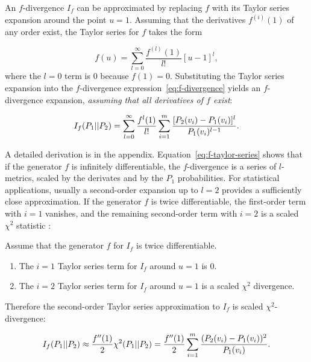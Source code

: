 {An $f$-divergence $I_{f}$ can be approximated by  replacing $f$ with its Taylor series expansion around the point $u=1$. Assuming that the derivatives $f^{(i)}(1)$ of any order exist, the Taylor series for $f$ takes the form 

 $$f(u) = \sum_{l=0}^{\infty} \frac{f^{(l)}(1)}{l!} [u-1]^{l},$$ where the $l=0$ term is 0 because $f(1) = 0$. Substituting the Taylor series expansion into the $f$-divergence expression~\eqref{eq:f-divergence}  yields an $f$-divergence expansion, {\em assuming that all derivatives of $f$ exist}:
 
\begin{equation*} \label{eq:f-taylor-series}
I_{f}(P_{1}||P_{2}) = \sum_{l=0}^{\infty} \frac{f^{l}(1)}{l!} \sum_{i=1}^{m} 
\frac{[P_{2}(v_{i}) - P_{1}(v_{i})]^{l}}
{P_{1}(v_{i})^{l-1}}.
\end{equation*}

A detailed derivation is in the appendix.  Equation~\eqref{eq:f-taylor-series} shows that if the generator $f$ is infinitely differentiable, the $f$-divergence is a series of $l$-metrics, scaled by the derivates and by the $P_1$ probabilities. For statistical applications, usually a second-order expansion up to $l=2$ provides a sufficiently close approximation. If the generator $f$ is twice differentiable, the first-order term with $i=1$ vanishes, and the remaining second-order term with $i=2$ is a scaled $\chi^{2}$ statistic \citep{Nielsen2014}:

\begin{proposition} \label{prop:xi-square}
Assume that the generator $f$ for $I_{f}$ is twice differentiable.   

\begin{enumerate}
\item The $i=1$ Taylor series term for  $I_{f}$ around $u=1$ is 0.
\item The $i=2$ Taylor series term for  $I_{f}$ around $u=1$ is a scaled $\chi^{2}$ divergence.
\end{enumerate}

Therefore the second-order Taylor series approximation to $I_{f}$ is scaled $\chi^{2}$-divergence:

$$I_{f}(P_{1}||P_{2}) \approx \frac{f''(1)}{2} \chi^{2}(P_{1}||P_{2}) = \frac{f''(1)}{2} 
\sum_{i=1}^{m}  \frac{(P_{2}(v_{i})-P_{1}(v_{i}))^{2}}
 {P_{1}(v_{i})}.$$ 
\end{proposition} 

}
